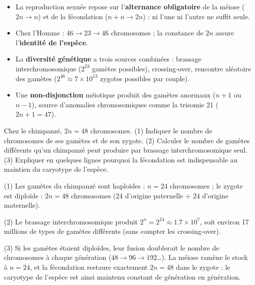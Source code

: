 \documentclass[11pt]{article}
\begin{document}
\begin{aretenir}
\begin{itemize}
\item La reproduction sexuée repose sur l'\textbf{alternance obligatoire} de la méiose ($2n \rightarrow n$) et de la fécondation ($n + n \rightarrow 2n$) : ni l'une ni l'autre ne suffit seule.
\item Chez l'Homme : $46 \rightarrow 23 \rightarrow 46$ chromosomes ; la constance de $2n$ assure l'\textbf{identité de l'espèce}.
\item La \textbf{diversité génétique} a trois sources combinées : brassage interchromosomique ($2^{23}$ gamètes possibles), crossing-over, rencontre aléatoire des gamètes ($2^{46} \approx 7 \times 10^{13}$ zygotes possibles par couple).
\item Une \textbf{non-disjonction} méiotique produit des gamètes anormaux ($n+1$ ou $n-1$), source d'anomalies chromosomiques comme la trisomie 21 ($2n+1 = 47$).
\end{itemize}
\end{aretenir}

\begin{exercice}
Chez le chimpanzé, $2n = 48$ chromosomes. (1) Indiquer le nombre de chromosomes de ses gamètes et de son zygote. (2) Calculer le nombre de gamètes différents qu'un chimpanzé peut produire par brassage interchromosomique seul. (3) Expliquer en quelques lignes pourquoi la fécondation est indispensable au maintien du caryotype de l'espèce.
\end{exercice}

\begin{corrige}
(1) Les gamètes du chimpanzé sont haploïdes : $n = 24$ chromosomes ; le zygote est diploïde : $2n = 48$ chromosomes (24 d'origine paternelle + 24 d'origine maternelle).

(2) Le brassage interchromosomique produit $2^n = 2^{24} \approx \num{1,7} \times 10^{7}$, soit environ 17 millions de types de gamètes différents (sans compter les crossing-over).

(3) Si les gamètes étaient diploïdes, leur fusion doublerait le nombre de chromosomes à chaque génération ($48 \rightarrow 96 \rightarrow 192$\dots). La méiose ramène le stock à $n = 24$, et la fécondation restaure exactement $2n = 48$ dans le zygote : le caryotype de l'espèce est ainsi maintenu constant de génération en génération.
\end{corrige}
\end{document}
